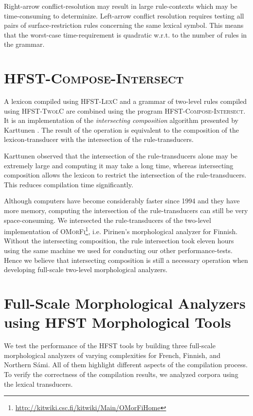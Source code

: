 \documentclass[postprint]{flammie}
\begin{document}
Right-arrow conflict-resolution may result in large rule-contexts
which may be time-consuming to determinize. Left-arrow conflict
resolution requires testing all pairs of surface-restriction rules
concerning the same lexical symbol. This means that the worst-case
time-requirement is quadratic w.r.t. to the number of rules in the
grammar.

\section{\textsc{HFST-Compose-Intersect}}

A lexicon compiled using \textsc{HFST-LexC} and a grammar of two-level
rules compiled using \textsc{HFST-TwolC} are combined using the
program \textsc{HFST-Compose-Intersect}. It is an implementation of
the \textit{intersecting composition} algorithm presented by Karttunen
\cite{Karttunen94}. The result of the operation is equivalent to the
composition of the lexicon-transducer with the intersection of the
rule-transducers.

Karttunen \cite{Karttunen94} observed that the intersection of the
rule-transducers alone may be extremely large and computing it may
take a long time, whereas intersecting composition allows the lexicon
to restrict the intersection of the rule-transducers. This reduces
compilation time significantly.

Although computers have become considerably faster since 1994 and they
have more memory, computing the intersection of the rule-transducers
can still be very space-consuming. We intersected the rule-transducers
of the two-level implementation of
\textsc{OMorFi}\footnote{\url{http://kitwiki.csc.fi/kitwiki/Main/OMorFiHome}},
i.e. Pirinen's \cite{pirinen2008} morphological analyzer for
Finnish. Without the intersecting composition, the rule intersection
took eleven hours using the same machine we used for conducting our
other performance-tests. Hence we believe that intersecting
composition is still a necessary operation when developing full-scale
two-level morphological analyzers.

\section{Full-Scale Morphological Analyzers using \textsc{HFST} Morphological
Tools} 

We test the performance of the \textsc{HFST} tools by building three
full-scale morphological analyzers of varying complexities for French,
Finnish, and Northern S\'{a}mi. All of them highlight different
aspects of the compilation process. To verify the correctness of the
compilation results, we analyzed corpora using the lexical
transducers.
\end{document}
